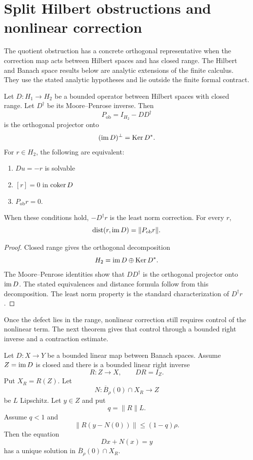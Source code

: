 \section{Split Hilbert obstructions and nonlinear correction}\label{sec:split_obstruction}

The quotient obstruction has a concrete orthogonal representative when the correction map acts between Hilbert spaces and has closed range. The Hilbert and Banach space results below are analytic extensions of the finite calculus. They use the stated analytic hypotheses and lie outside the finite formal contract.

\begin{theorem}\label{thm:orthogonal_obstruction}
Let $D:H_1\to H_2$ be a bounded operator between Hilbert spaces with closed range.  Let $D^\dagger$ be its Moore--Penrose inverse.  Then
\[
P_{\mathrm{ob}}=I_{H_2}-DD^\dagger
\]
is the orthogonal projector onto
\[
(\operatorname{im} D)^\perp=\operatorname{Ker} D^*.
\]
For $r\in H_2$, the following are equivalent:
\begin{enumerate}
\item $Du=-r$ is solvable
\item $[r]=0$ in $\operatorname{coker} D$
\item $P_{\mathrm{ob}}r=0$.
\end{enumerate}
When these conditions hold, $-D^\dagger r$ is the least norm correction.  For every $r$,
\[
\operatorname{dist}(r,\operatorname{im} D)=\|P_{\mathrm{ob}}r\|.
\]
\end{theorem}

\begin{proof}
Closed range gives the orthogonal decomposition
\[
H_2=\operatorname{im} D\oplus\operatorname{Ker} D^*.
\]
The Moore--Penrose identities show that $DD^\dagger$ is the orthogonal projector onto $\operatorname{im} D$.  The stated equivalences and distance formula follow from this decomposition.  The least norm property is the standard characterization of $D^\dagger r$.
\end{proof}

Once the defect lies in the range, nonlinear correction still requires control of the nonlinear term. The next theorem gives that control through a bounded right inverse and a contraction estimate.

\begin{theorem}\label{thm:right_inverse_correction}
Let $D:X\to Y$ be a bounded linear map between Banach spaces.  Assume $Z=\operatorname{im} D$ is closed and there is a bounded linear right inverse
\[
R:Z\longrightarrow X,
\qquad
DR=I_Z.
\]
Put $X_R=R(Z)$.  Let
\[
N:\overline B_\rho(0)\cap X_R\longrightarrow Z
\]
be $L$ Lipschitz.  Let $y\in Z$ and put
\[
q=\|R\|L.
\]
Assume $q<1$ and
\[
\|R(y-N(0))\|
\le
(1-q)\rho.
\]
Then the equation
\[
Dx+N(x)=y
\]
has a unique solution in $\overline B_\rho(0)\cap X_R$.
\end{theorem}

